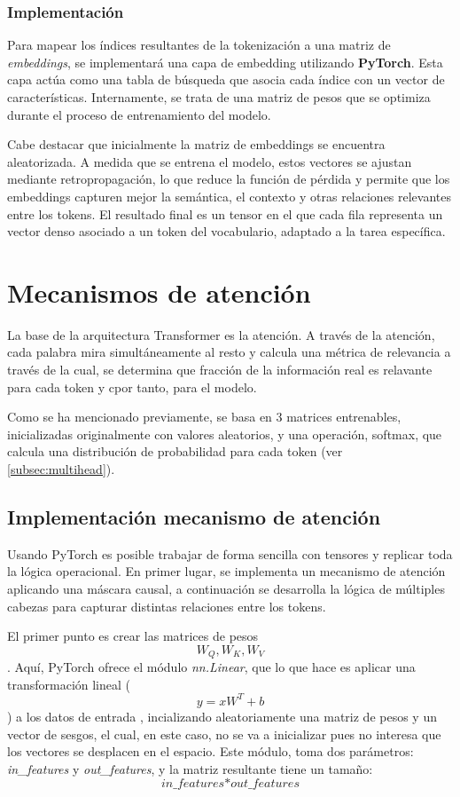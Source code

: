 \documentclass[11pt]{book}
\theoremstyle{plain}
\theoremstyle{definition}
\begin{document}
\subsubsection{Implementación}
Para mapear los índices resultantes de la tokenización a una matriz de \textit{embeddings}, se implementará una capa de embedding utilizando \textbf{PyTorch}. Esta capa actúa como una tabla de búsqueda que asocia cada índice con un vector de características. Internamente, se trata de una matriz de pesos que se optimiza durante el proceso de entrenamiento del modelo.

Cabe destacar que inicialmente la matriz de embeddings se encuentra aleatorizada. A medida que se entrena el modelo, estos vectores se ajustan mediante retropropagación, lo que reduce la función de pérdida y permite que los embeddings capturen mejor la semántica, el contexto y otras relaciones relevantes entre los tokens. El resultado final es un tensor en el que cada fila representa un vector denso asociado a un token del vocabulario, adaptado a la tarea específica. \parencite{bao2022embedding}

\section{Mecanismos de atención}
La base de la arquitectura Transformer es la atención. A través de la atención, cada palabra mira simultáneamente al resto y calcula una métrica de relevancia a través de la cual, se determina que fracción de la información real es relavante para cada token y cpor tanto, para el modelo. 

Como se ha mencionado previamente, se basa en 3 matrices entrenables, inicializadas originalmente con valores aleatorios, y una operación, softmax, que calcula una distribución de probabilidad para cada token (ver \cref{subsec:multihead}).


\subsection{Implementación mecanismo de atención}
Usando PyTorch es posible trabajar de forma sencilla con tensores y replicar toda la lógica operacional. En primer lugar, se implementa un mecanismo de atención aplicando una máscara causal, a continuación se desarrolla la lógica de múltiples cabezas para capturar distintas relaciones entre los tokens.

El primer punto es crear las matrices de pesos \[W_Q, W_K, W_V\]. Aquí, PyTorch ofrece el módulo \textit{nn.Linear}, que lo que hace es aplicar una transformación lineal (\[y = xW^T + b\]) a los datos de entrada \parencite{kanaries_nnlinear}, incializando aleatoriamente una matriz de pesos y un vector de sesgos, el cual, en este caso, no se va a inicializar pues no interesa que los vectores se desplacen en el espacio. Este módulo, toma dos parámetros: \textit{in\_features} y \textit{out\_features}, y la matriz resultante tiene un tamaño: \[\textit{in\_features} * \textit{out\_features}\]
\end{document}

